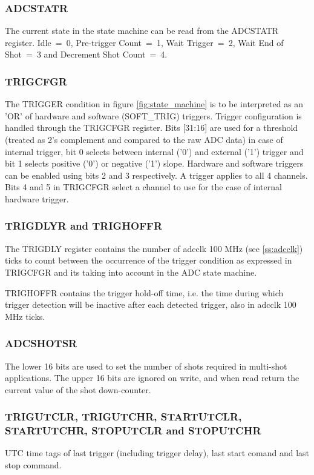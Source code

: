 \documentclass{article}
\begin{document}
\subsubsection{ADCSTATR}
The current state in the state machine can be read from the ADCSTATR register. Idle~=~0, Pre-trigger Count~=~1, Wait Trigger~=~2, Wait End of Shot~=~3 and Decrement Shot Count~=~4.

\subsubsection{TRIGCFGR}
The TRIGGER condition in figure \ref{fig:state_machine} is to be interpreted as an 'OR' of hardware and software (SOFT\_TRIG) triggers. Trigger configuration is handled through the TRIGCFGR register. Bits [31:16] are used for a threshold (treated as 2's complement and compared to the raw ADC data) in case of internal trigger, bit 0 selects between internal ('0') and external ('1') trigger and bit 1 selects positive ('0') or negative ('1') slope. Hardware and software triggers can be enabled using bits 2 and 3 respectively. A trigger applies to all 4 channels. Bits 4 and 5 in TRIGCFGR select a channel to use for the case of internal hardware trigger.  

\subsubsection{TRIGDLYR and TRIGHOFFR}
The TRIGDLY register contains the number of adcclk 100 MHz (see \ref{ss:adcclk}) ticks to count between the occurrence of the trigger condition as expressed in TRIGCFGR and its taking into account in the ADC state machine. 

TRIGHOFFR contains the trigger hold-off time, i.e. the time during which trigger detection will be inactive after each detected trigger, also in adcclk 100 MHz ticks.

\subsubsection{ADCSHOTSR}
The lower 16 bits are used to set the number of shots required in multi-shot applications. The upper 16 bits are ignored on write, and when read return the current value of the shot down-counter.

\subsubsection{TRIGUTCLR, TRIGUTCHR, STARTUTCLR, \\STARTUTCHR, STOPUTCLR and STOPUTCHR}
UTC time tags of last trigger (including trigger delay), last start comand and last stop command.
\end{document}
